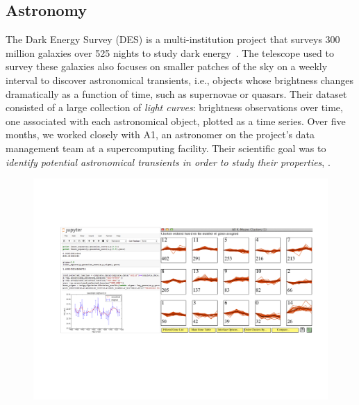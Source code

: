  \subsection{Astronomy}
 \par\noindent{} 
 \npar The Dark Energy Survey (DES) is a multi-institution project that surveys 300 million galaxies over 525 nights to study dark energy~\cite{DrlicaWagner2018}. The telescope used to survey these galaxies also focuses on smaller patches of the sky on a weekly interval to discover astronomical transients, i.e., objects whose brightness changes dramatically as a function of time, such as supernovae or quasars. Their dataset consisted of a large collection of \emph{light curves}: brightness observations over time, one associated with each astronomical object, plotted as a time series. Over five months, we worked closely with A1, an astronomer on the project's data management team at a supercomputing facility. Their scientific goal was to \emph{identify potential astronomical transients in order to study their properties}, . 
 \begin{figure}[ht!]
   \centering
   \includegraphics[width=\linewidth]{figures/CIscreenshot.pdf}
   \caption{}
   \label{CIscreenshot}
   \vspace*{-15pt}
 \end{figure}
